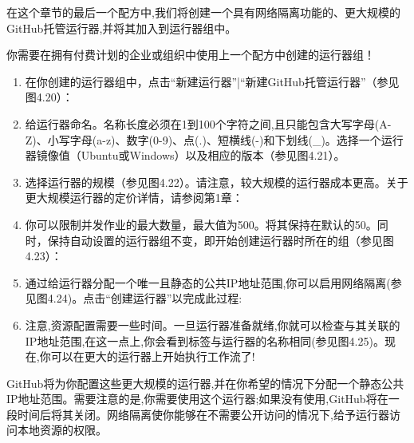 在这个章节的最后一个配方中,我们将创建一个具有网络隔离功能的、更大规模的GitHub托管运行器,并将其加入到运行器组中。


你需要在拥有付费计划的企业或组织中使用上一个配方中创建的运行器组！


\begin{enumerate}
\item 
在你创建的运行器组中，点击“新建运行器”|“新建GitHub托管运行器”（参见图4.20）：


\item 
给运行器命名。名称长度必须在1到100个字符之间,且只能包含大写字母(A-Z)、小写字母(a-z)、数字(0-9)、点(.)、短横线(-)和下划线(\_)。选择一个运行器镜像值（Ubuntu或Windows）以及相应的版本（参见图4.21）。


\item 
选择运行器的规模（参见图4.22）。请注意，较大规模的运行器成本更高。关于更大规模运行器的定价详情，请参阅第1章：


\item 
你可以限制并发作业的最大数量，最大值为500。将其保持在默认的50。同时，保持自动设置的运行器组不变，即开始创建运行器时所在的组（参见图4.23）：


\item 
通过给运行器分配一个唯一且静态的公共IP地址范围,你可以启用网络隔离(参见图4.24)。点击“创建运行器”以完成此过程:


\item 
注意,资源配置需要一些时间。一旦运行器准备就绪,你就可以检查与其关联的IP地址范围,在这一点上,你会看到标签与运行器的名称相同(参见图4.25)。现在,你可以在更大的运行器上开始执行工作流了!


\end{enumerate}


GitHub将为你配置这些更大规模的运行器,并在你希望的情况下分配一个静态公共IP地址范围。需要注意的是,你需要使用这个运行器;如果没有使用,GitHub将在一段时间后将其关闭。网络隔离使你能够在不需要公开访问的情况下,给予运行器访问本地资源的权限。